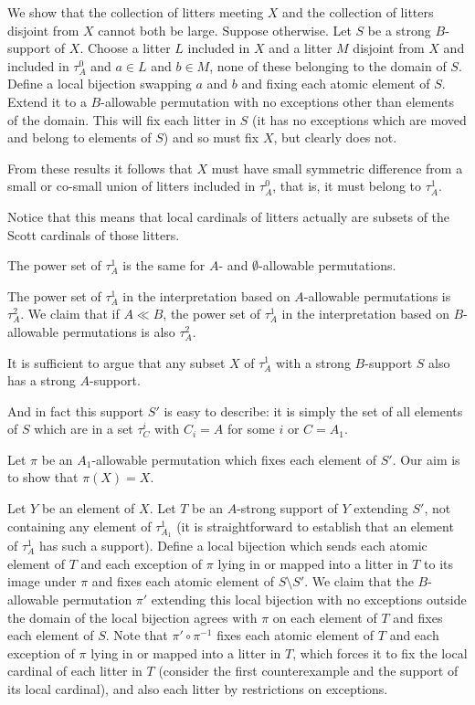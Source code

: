 \documentclass{slides}
\begin{document}
\begin{slide}
We show that the collection of litters meeting $X$ and the collection of litters disjoint from $X$ cannot both be large.  Suppose otherwise.  Let $S$ be a strong $B$-support of $X$.
Choose a litter $L$ included in $X$ and a litter $M$ disjoint from $X$ and included in $\tau^0_A$  and $a \in L$ and $b \in M$, none of these belonging to the domain of $S$.  Define a local bijection swapping $a$ and $b$ and fixing each atomic element of $S$.  Extend it to a $B$-allowable permutation with no exceptions other than elements of the domain.  This will fix
each litter in $S$ (it has no exceptions which are moved and belong to elements of $S$) and so must fix $X$, but clearly does not.

From these results it follows that $X$ must have small symmetric difference from a small or co-small union of litters included in $\tau^0_A$, that is, it must belong to $\tau^1_A$.

Notice that this means that local cardinals of litters actually are subsets of the Scott cardinals of those litters.

\end{slide}

{\Large The power set of $\tau^1_A$ is the same for $A$- and $\emptyset$-allowable permutations.}

The power set of $\tau^1_A$ in the interpretation based on $A$-allowable permutations is $\tau^2_A$.  We claim that if $A \ll B$, the power set of  $\tau^1_A$ in
the interpretation based on $B$-allowable permutations is also $\tau^2_A$.

It is sufficient to argue that any subset $X$ of $\tau^1_A$ with a strong $B$-support $S$ also has a strong $A$-support.

And in fact this support $S'$ is easy to describe:  it is simply the set of all elements of $S$ which are in a set $\tau^i_C$ with $C_i = A$ for some $i$ or $C=A_1$.

Let $\pi$ be an $A_1$-allowable permutation which fixes each element of $S'$.  Our aim is to show that $\pi(X)=X$.

Let $Y$ be an element of $X$.  Let $T$ be an $A$-strong support of $Y$ extending $S'$, not containing any element of $\tau^1_{A_1}$ (it is straightforward to establish that
an element of $\tau^1_A$ has such a support).  Define a local bijection which sends each atomic element of $T$ and each exception of $\pi$ lying in or mapped into a litter in $T$ to its image under $\pi$
and fixes each atomic element of $S \setminus S'$.  We claim that the $B$-allowable permutation $\pi'$ extending this local bijection with no exceptions outside the domain of the local bijection  agrees with $\pi$ on each element of $T$ and fixes each element of $S$.  Note that $\pi' \circ \pi^{-1}$ fixes each atomic element of $T$ and each exception of $\pi$ lying in or mapped into a litter in $T$, which forces it to fix the local cardinal of each litter in $T$ (consider the first counterexample and the support of its local cardinal), and also each litter by restrictions on exceptions. 
\end{document}
